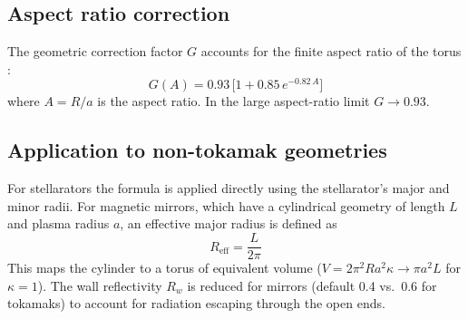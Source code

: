 \documentclass{article}
\begin{document}
\subsection{Aspect ratio correction}

The geometric correction factor $G$ accounts for the finite aspect
ratio of the torus \citep{albajar2001}:
%
\begin{equation}
\label{eq:G-factor}
G(A) = 0.93\,\bigl[1 + 0.85\,e^{-0.82\,A}\bigr]
\end{equation}
%
where $A = R/a$ is the aspect ratio. In the large aspect-ratio limit
$G \to 0.93$.

\subsection{Application to non-tokamak geometries}

For stellarators the formula is applied directly using the
stellarator's major and minor radii. For magnetic mirrors, which have
a cylindrical geometry of length $L$ and plasma radius $a$, an
effective major radius is defined as
%
\begin{equation}
\label{eq:R-eff-mirror}
R_{\text{eff}} = \frac{L}{2\pi}
\end{equation}
%
This maps the cylinder to a torus of equivalent volume
($V = 2\pi^2 R a^2 \kappa \to \pi a^2 L$ for $\kappa = 1$). The
wall reflectivity $R_w$ is reduced for mirrors (default 0.4 vs.\ 0.6
for tokamaks) to account for radiation escaping through the open ends.



\end{document}
